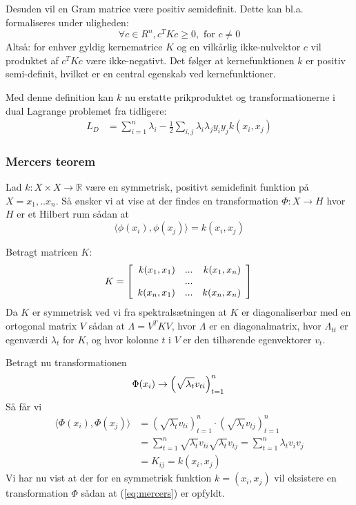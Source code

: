 \documentclass{article}
\begin{document}
Desuden vil en Gram matrice være positiv semidefinit. Dette kan bl.a. formaliseres under uligheden:
\begin{equation}
\forall c\in R^n,c^TKc\geq 0,\text{ for }c\neq 0
\end{equation}
Altså: for enhver gyldig kernematrice $K$ og en vilkårlig ikke-nulvektor $c$ vil produktet af $c^TKc$ være ikke-negativt. Det følger at kernefunktionen $k$ er positiv semi-definit, hvilket er en central egenskab ved kernefunktioner.

Med denne definition kan $k$ nu erstatte prikproduktet og transformationerne i dual Lagrange problemet fra tidligere:
\begin{align*}
L_D&=\sum_{i=1}^{n}\lambda_i-\frac{1}{2}\sum_{i,j}\lambda_i\lambda_j y_iy_jk(x_i,x_j)
\end{align*}


\subsubsection{Mercers teorem}
Lad $k:X\times X\rightarrow \mathbb{R}$ være en symmetrisk, positivt semidefinit funktion på $X={x_1,..x_n}$. Så ønsker vi at vise at der findes en transformation $\Phi:X\rightarrow H$ hvor $H$ er et Hilbert rum sådan at 
\begin{equation}
\label{eq:mercers}
\langle\phi(x_i),\phi(x_j)\rangle=k(x_i,x_j)
\end{equation}

Betragt matricen $K:$
\begin{equation}
K=\left[\begin{array}{r r r}
k(x_1,x_1) & ... &k(x_1,x_n)\\
& ... & \\
k(x_n,x_1) & ... &k(x_n,x_n)\\
\end{array}\right]\\
\end{equation}
Da $K$ er symmetrisk ved vi fra spektralsætningen at $K$ er diagonaliserbar med en ortogonal matrix $V$ sådan at $\Lambda=V^TKV$, hvor $\Lambda$ er en diagonalmatrix, hvor $\Lambda_{tt}$ er egenværdi $\lambda_t$ for $K$, og hvor kolonne $t$ i $V$ er den tilhørende egenvektorer $v_t$.

Betragt nu transformationen 
\begin{equation}
\Phi(x_i)\rightarrow\left(\sqrt{\lambda_t}v_{ti}\right)_{t=1}^n\\
\end{equation}
Så får vi
\begin{align}
\langle\Phi(x_i),\Phi(x_j)\rangle&=\left(\sqrt{\lambda_t}v_{ti}\right)_{t=1}^n\cdot\left(\sqrt{\lambda_t}v_{tj}\right)_{t=1}^n\\
&=\sum_{t=1}^n\sqrt{\lambda_t}v_{ti}\sqrt{\lambda_t}v_{tj}=\sum_{t=1}^{n}\lambda_tv_iv_j\\
&=K_{ij}=k(x_i,x_j)
\end{align}
Vi har nu vist at der for en symmetrisk funktion $k=(x_i,x_j)$ vil eksistere en transformation $\Phi$ sådan at (\ref{eq:mercers}) er opfyldt.
\end{document}
